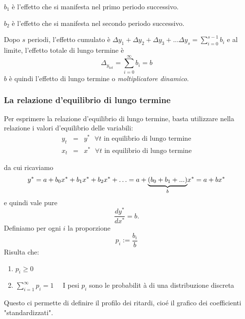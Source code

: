 \documentclass[a4paper]{report}
\newcounter{def}
\theoremstyle{remark}
\begin{document}
\noindent $b_{1}$ \`{e} l'effetto che si manifesta nel primo periodo
successivo.

\noindent $b_{2}$ \`{e} l'effetto che si manifesta nel secondo periodo
successivo.\bigskip

\noindent Dopo $s$ periodi, l'effetto cumulato \`{e} $\Delta y_{1}+\Delta
y_{2}+\Delta y_{3}+...\Delta y_{s}=\sum_{i=0}^{s-1}b_{i}$ e al limite,
l'effetto totale di lungo termine \`{e}%
\begin{equation*}
\Delta _{y_{tot}}=\sum_{i=0}^{\infty }b_{i}=b
\end{equation*}%
$b$ \`{e} quindi l'effetto di lungo termine o \emph{moltiplicatore dinamico}.

\subsubsection{La relazione d'equilibrio di lungo termine}

Per esprimere la relazione d'equilibrio di lungo termine, basta utilizzare
nella relazione i valori d'equilibrio delle variabili:%
\begin{eqnarray*}
y_{t} &=&y^{\ast }\ \ \ \forall t\text{ in equilibrio di lungo termine} \\
x_{t} &=&x^{\ast }\ \ \ \forall t\text{ in equilibrio di lungo termine}
\end{eqnarray*}

da cui ricaviamo%
\begin{equation*}
y^{\ast }=a+b_{0}x^{\ast }+b_{1}x^{\ast }+b_{2}x^{\ast }+\ldots =a+\underset{%
b}{\underbrace{(b_{0}+b_{1}+...)}}x^{\ast }=a+bx^{\ast }
\end{equation*}%
e quindi vale pure%
\begin{equation*}
\frac{dy^{\ast }}{dx^{\ast }}=b.
\end{equation*}%
Definiamo per ogni $i$ la proporzione 
\begin{equation*}
p_{i}:=\frac{b_{i}}{b}
\end{equation*}%
Risulta che:

\begin{enumerate}
\item $p_{i}\geq 0$

\item $\sum_{i=1}^{\infty }p_{i}=1$ \ \ I pesi $p_{i}$ sono le probabilit%
\`{a} di una distribuzione discreta
\end{enumerate}

Questo ci permette di definire il profilo dei ritardi, cio\'{e} il grafico
dei coefficienti "standardizzati".
\end{document}
